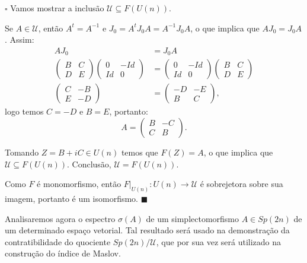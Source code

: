 \documentclass[12pt]{book}
\newenvironment{prova}[1]{$\square$ #1}{\hfill$\blacksquare$}
\newcommand{\espectrooperador}[1]{\sigma(#1)}
\newcommand{\estruturacomplexa}{J_{0}}
\newcommand{\gruposimpletico}[1]{Sp(#1)}
\newcommand{\matrizSimpleticaOrtogonal}{\mathcal{U}}
\newcommand{\matrizunitaria}[1]{U(#1)}
\begin{document}
\begin{prova}
		Vamos mostrar a inclusão $\matrizSimpleticaOrtogonal \subseteq F(\matrizunitaria{n})$. 
		
		Se $A \in \matrizSimpleticaOrtogonal$, então $A^{t}=A^{-1}$ e $\estruturacomplexa=A^{t}\estruturacomplexa  A=A^{-1}\estruturacomplexa A$, o que implica que $A\estruturacomplexa=\estruturacomplexa A$. Assim:
		$$
		\begin{aligned}
		A\estruturacomplexa&=\estruturacomplexa A
		\\
		\left(
		\begin{array}{cc}
		B & C
		\\
		D & E
		\end{array}
		\right)
		\left(
		\begin{array}{cc}
		0 & -Id
		\\
		Id & 0
		\end{array}
		\right)
		&=
		\left(
		\begin{array}{cc}
		0 & -Id
		\\
		Id & 0
		\end{array}
		\right)
		\left(
		\begin{array}{cc}
		B & C
		\\
		D & E
		\end{array}
		\right)
		\\
		\left(
		\begin{array}{cc}
		C & -B
		\\
		E & -D
		\end{array}
		\right)
		&=
		\left(
		\begin{array}{cc}
		-D & -E
		\\
		B & C
		\end{array}
		\right), 
		\end{aligned}
		$$
		logo temos $C=-D$ e $B=E$, portanto:
		$$
		A=\left(
		\begin{array}{cc}
		B & -C
		\\
		C & B
		\end{array}
		\right).
		$$
		
		Tomando $Z = B+iC \in \matrizunitaria{n}$ temos que $F(Z) = A$, o que implica que $\matrizSimpleticaOrtogonal \subseteq F(\matrizunitaria{n})$. Conclusão, $\matrizSimpleticaOrtogonal = F(\matrizunitaria{n})$. 
		
		Como $F$ é monomorfismo, então $F|_{\matrizunitaria{n}}:\matrizunitaria{n} \to \matrizSimpleticaOrtogonal$ é sobrejetora sobre sua imagem, portanto é um isomorfismo.
	\end{prova}
	
	Analisaremos agora o espectro $\espectrooperador{A}$ de um simplectomorfismo $A \in \gruposimpletico{2n}$ de um determinado espaço vetorial. Tal resultado será usado na demonstração da contratibilidade do quociente $\gruposimpletico{2n}/\matrizSimpleticaOrtogonal$, que por sua vez será utilizado na construção do índice de Maslov.
	
\end{document}
